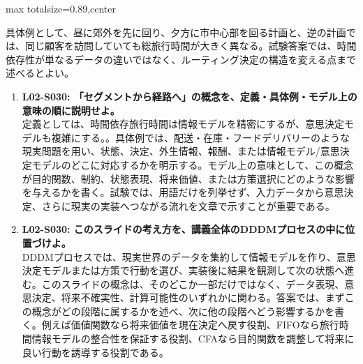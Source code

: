 \begin{minipage}[t]{0.58\textwidth}
\begin{adjustbox}{max totalsize={\textwidth}{0.89\textheight},center}
\begin{minipage}{\textwidth}
具体例として、昼に郊外を先に回り、夕方に市中心部を回る計画と、逆の計画では、同じ顧客を訪問していても総旅行時間が大きく異なる。試験答案では、時間依存性が単なるデータの違いではなく、ルーティング決定の構造を変える点まで述べるとよい。\par{}\begin{enumerate}\item \textbf{L02-S030: 「セグメントから経路へ」の概念を、定義・具体例・モデル上の意味の順に説明せよ。}\\定義としては、時間依存旅行時間は情報モデルを精密にするが、意思決定モデルも複雑にする。。具体例では、配送・在庫・フードデリバリーのような現実問題を用い、状態、決定、外生情報、報酬、または情報モデル/意思決定モデルのどこに対応するかを明示する。モデル上の意味として、この概念が目的関数、制約、状態表現、将来価値、または方策選択にどのような影響を与えるかを書く。試験では、用語だけを列挙せず、入力データから意思決定、さらに現実の実装へつながる流れを文章で示すことが重要である。\item \textbf{L02-S030: このスライドの考え方を、講義全体のDDDMプロセスの中に位置づけよ。}\\DDDMプロセスでは、現実世界のデータを集約して情報モデルを作り、意思決定モデルまたは方策で行動を選び、実装後に結果を観測して次の状態へ進む。このスライドの概念は、そのどこか一部だけではなく、データ表現、意思決定、将来不確実性、計算可能性のいずれかに関わる。答案では、まずこの概念がどの段階に属するかを述べ、次に他の段階へどう影響するかを書く。例えば価値関数なら将来価値を現在決定へ戻す役割、FIFOなら旅行時間情報モデルの整合性を保証する役割、CFAなら目的関数を調整して将来に良い行動を誘導する役割である。\end{enumerate}
\end{minipage}
\end{adjustbox}
\end{minipage}


